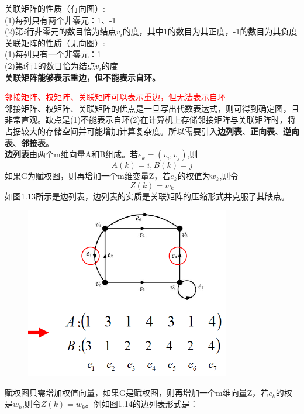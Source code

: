 \documentclass[11pt,a4paper,openany]{book}
\begin{document}
\begin{shaded}
\noindent 关联矩阵的性质（有向图）:\\
(1)每列只有两个非零元：1、-1\\
(2)第$i$行非零元的数目恰为结点$v_i$的度，其中1的数目为其正度，-1的数目为其负度\\
关联矩阵的性质（无向图）:\\
(1)每列只有一个非零元：1\\
(2)第i行1的数目恰为结点$v_i$的度\\
\textbf{关联矩阵能够表示重边，但不能表示自环。}
\end{shaded}

\textcolor{red}{邻接矩阵、权矩阵、关联矩阵可以表示重边，但无法表示自环}\\
邻接矩阵、权矩阵、关联矩阵的优点是一旦写出代数表达式，则可得到确定图，且非常直观。缺点是(1)不能表示自环(2)在计算机上存储邻接矩阵与关联矩阵时，将占据较大的存储空间并可能增加计算复杂度。所以需要引入\textbf{边列表}、\textbf{正向表}、\textbf{逆向表}、\textbf{邻接表}。\\
\noindent \textbf{边列表}由两个m维向量A和B组成。若$e_k=(v_i,v_j)$,则$$A(k)=i,B(k)=j$$
如果G为赋权图，则再增加一个m维变量Z，若$e_k$的权值为$w_k$,则令$$Z(k)=w_k$$
如图1.13所示是边列表，边列表的实质是关联矩阵的压缩形式并克服了其缺点。\\
\begin{figure}[H]
  \centering
  \includegraphics[width=0.8\textwidth]{1.13.png}\\
  \caption{}
\end{figure}
\indent 赋权图只需增加权值向量，如果G是赋权图，则再增加一个m维向量Z，若$e_k$的权是$w_k$,则令$Z(k)=w_k$。例如图1.14的边列表形式是：
\end{document}

